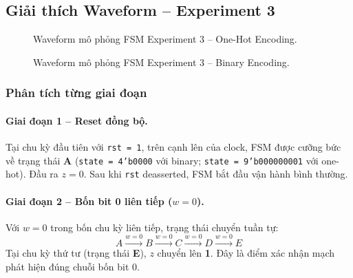 \documentclass[12pt, a4paper]{article}
\begin{document}
\subsection{Giải thích Waveform -- Experiment 3}
\label{subsec:exp3-wave}

\begin{figure}[H]
    \centering
    \caption{Waveform mô phỏng FSM Experiment 3 -- One-Hot Encoding.}
    \label{fig:wave-exp3-oh}
\end{figure}

\begin{figure}[H]
    \centering
    \caption{Waveform mô phỏng FSM Experiment 3 -- Binary Encoding.}
    \label{fig:wave-exp3-bin}
\end{figure}

\subsubsection{Phân tích từng giai đoạn}

\paragraph{Giai đoạn 1 -- Reset đồng bộ.}
Tại chu kỳ đầu tiên với \texttt{rst = 1}, trên cạnh lên của clock, FSM được cưỡng bức về trạng thái \textbf{A} (\texttt{state = 4'b0000} với binary; \texttt{state = 9'b000000001} với one-hot). Đầu ra $z = 0$. Sau khi \texttt{rst} deasserted, FSM bắt đầu vận hành bình thường.

\paragraph{Giai đoạn 2 -- Bốn bit 0 liên tiếp ($w = 0$).}
Với $w = 0$ trong bốn chu kỳ liên tiếp, trạng thái chuyển tuần tự:
\[
A \xrightarrow{w=0} B \xrightarrow{w=0} C \xrightarrow{w=0} D \xrightarrow{w=0} E
\]
Tại chu kỳ thứ tư (trạng thái \textbf{E}), $z$ chuyển lên \textbf{1}. Đây là điểm xác nhận mạch phát hiện đúng chuỗi bốn bit 0.
\end{document}
